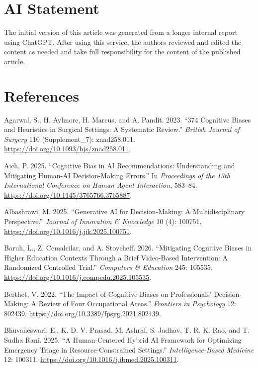 \documentclass[
  letterpaper,
  DIV=11,
  numbers=noendperiod]{scrartcl}
\newlength{\cslhangindent}
\newenvironment{CSLReferences}[2] %
 {\begin{list}{}{%
  \setlength{\itemindent}{0pt}
  \setlength{\leftmargin}{0pt}
  \setlength{\parsep}{0pt}
  \ifodd #1
   \setlength{\leftmargin}{\cslhangindent}
   \setlength{\itemindent}{-1\cslhangindent}
  \fi
  \setlength{\itemsep}{#2\baselineskip}}}
 {\end{list}}
\begin{document}
\section{AI Statement}\label{ai-statement}

The initial version of this article was generated from a longer internal
report using ChatGPT. After using this service, the authors reviewed and
edited the content as needed and take full responsibility for the
content of the published article.

\section*{References}\label{references}

\label{refs}
\begin{CSLReferences}{1}{0}
Agarwal, S., H. Aylmore, H. Marcus, and A. Pandit. 2023. {``374
Cognitive Biases and Heuristics in Surgical Settings: {A} Systematic
Review.''} \emph{British Journal of Surgery} 110 (Supplement\_7):
znad258.011. \url{https://doi.org/10.1093/bjs/znad258.011}.

Aich, P. 2025. {``Cognitive Bias in {AI} Recommendations:
{Understanding} and Mitigating Human-{AI} Decision-Making Errors.''} In
\emph{Proceedings of the 13th International Conference on Human-Agent
Interaction}, 583--84. \url{https://doi.org/10.1145/3765766.3765887}.

Albashrawi, M. 2025. {``Generative {AI} for Decision-Making: {A}
Multidisciplinary Perspective.''} \emph{Journal of Innovation \&
Knowledge} 10 (4): 100751.
\url{https://doi.org/10.1016/j.jik.2025.100751}.

Baruh, L., Z. Cemalcilar, and A. Stoycheff. 2026. {``Mitigating
Cognitive Biases in Higher Education Contexts Through a Brief
Video-Based Intervention: {A} Randomized Controlled Trial.''}
\emph{Computers \& Education} 245: 105535.
\url{https://doi.org/10.1016/j.compedu.2025.105535}.

Berthet, V. 2022. {``The Impact of Cognitive Biases on Professionals'
Decision-Making: {A} Review of Four Occupational Areas.''}
\emph{Frontiers in Psychology} 12: 802439.
\url{https://doi.org/10.3389/fpsyg.2021.802439}.

Bhuvaneswari, E., K. D. V. Prasad, M. Ashraf, S. Jadhav, T. R. K. Rao,
and T. Sudha Rani. 2025. {``A Human-Centered Hybrid {AI} Framework for
Optimizing Emergency Triage in Resource-Constrained Settings.''}
\emph{Intelligence-Based Medicine} 12: 100311.
\url{https://doi.org/10.1016/j.ibmed.2025.100311}.


\end{CSLReferences}
\end{document}
